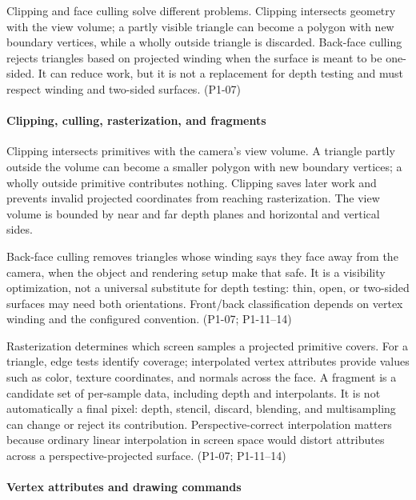 Clipping and face culling solve different problems. Clipping intersects geometry with the view volume; a partly visible triangle can become a polygon with new boundary vertices, while a wholly outside triangle is discarded. Back-face culling rejects triangles based on projected winding when the surface is meant to be one-sided. It can reduce work, but it is not a replacement for depth testing and must respect winding and two-sided surfaces. (P1-07)

\paragraph{Clipping, culling, rasterization, and fragments}\label{clipping-culling-rasterization-and-fragments}

Clipping intersects primitives with the camera's view volume. A triangle partly outside the volume can become a smaller polygon with new boundary vertices; a wholly outside primitive contributes nothing. Clipping saves later work and prevents invalid projected coordinates from reaching rasterization. The view volume is bounded by near and far depth planes and horizontal and vertical sides.

Back-face culling removes triangles whose winding says they face away from the camera, when the object and rendering setup make that safe. It is a visibility optimization, not a universal substitute for depth testing: thin, open, or two-sided surfaces may need both orientations. Front/back classification depends on vertex winding and the configured convention. (P1-07; P1-11--14)

Rasterization determines which screen samples a projected primitive covers. For a triangle, edge tests identify coverage; interpolated vertex attributes provide values such as color, texture coordinates, and normals across the face. A fragment is a candidate set of per-sample data, including depth and interpolants. It is not automatically a final pixel: depth, stencil, discard, blending, and multisampling can change or reject its contribution. Perspective-correct interpolation matters because ordinary linear interpolation in screen space would distort attributes across a perspective-projected surface. (P1-07; P1-11--14)

\paragraph{Vertex attributes and drawing commands}\label{vertex-attributes-and-drawing-commands}


